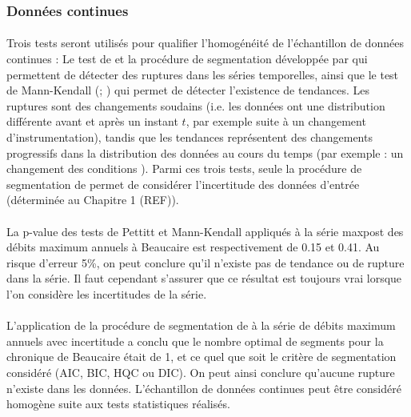 \documentclass[11pt]{article}
\begin{document}
	\subsubsection{Données continues}
	
	\paragraph{} Trois tests seront utilisés pour qualifier l'homogénéité de l'échantillon de données continues : Le test de \cite{pettitt_non-parametric_1979} et la procédure de segmentation développée par \citet{darienzo_detection_2021-1} qui permettent de détecter des ruptures dans les séries temporelles, ainsi que le test de Mann-Kendall (\cite{mann_nonparametric_1945}; \cite{kendall_rank_1948}) qui permet de détecter l'existence de tendances. Les ruptures sont des changements soudains (i.e. les données ont une distribution différente avant et après un instant $t$, par exemple suite à un changement d'instrumentation), tandis que les tendances représentent des changements progressifs dans la distribution des données au cours du temps (par exemple : un changement des conditions ). Parmi ces trois tests, seule la procédure de segmentation de \citet{darienzo_detection_2021-1} permet de considérer l'incertitude des données d'entrée (déterminée au Chapitre 1 (REF)).
	
	\paragraph{} La p-value des tests de Pettitt et Mann-Kendall appliqués à la série maxpost des débits maximum annuels à Beaucaire est respectivement de 0.15 et 0.41. Au risque d'erreur 5\%, on peut conclure qu'il n'existe pas de tendance ou de rupture dans la série. Il faut cependant s'assurer que ce résultat est toujours vrai lorsque l'on considère les incertitudes de la série.
			
	\paragraph{} L'application de la procédure de segmentation de \citet{darienzo_detection_2021-1} à la série de débits maximum annuels avec incertitude a conclu que le nombre optimal de segments pour la chronique de Beaucaire était de 1, et ce quel que soit le critère de segmentation considéré (AIC, BIC, HQC ou DIC). On peut ainsi conclure qu'aucune rupture n'existe dans les données. L'échantillon de données continues peut être considéré homogène suite aux tests statistiques réalisés. 
	
\end{document}
